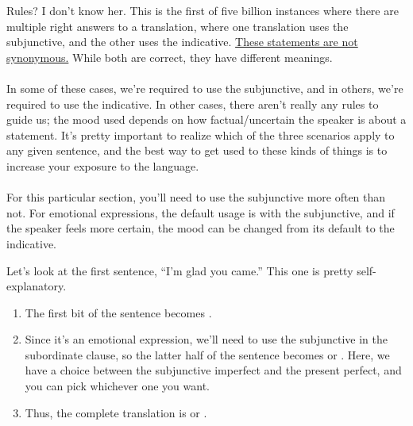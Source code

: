 \begin{conf}{Rules? I don't know her.}
	This is the first of five billion instances where there are multiple right answers to a translation, where one translation uses the subjunctive, and the other uses the indicative. \underline{These statements are not synonymous.} While both are correct, they have different meanings. \\
	
\\	In some of these cases, we're required to use the subjunctive, and in others, we're required to use the indicative. In other cases, there aren't really any rules to guide us; the mood used depends on how factual/uncertain the speaker is about a statement. It's pretty important to realize which of the three scenarios apply to any given sentence, and the best way to get used to these kinds of things is to increase your exposure to the language. \\

\\ For this particular section, you'll need to use the subjunctive more often than not. For emotional expressions, the default usage is with the subjunctive, and if the speaker feels more certain, the mood can be changed from its default to the indicative. 
\end{conf}

Let's look at the first sentence, ``I'm glad you came.'' This one is pretty self-explanatory. 
\begin{enumerate}
	\item The first bit of the sentence becomes . 
	\item Since it's an emotional expression, we'll need to use the subjunctive in the subordinate clause, so the latter half of the sentence becomes  or . Here, we have a choice between the subjunctive imperfect and the present perfect, and you can pick whichever one you want. 
	\item Thus, the complete translation is  or .
\end{enumerate}

